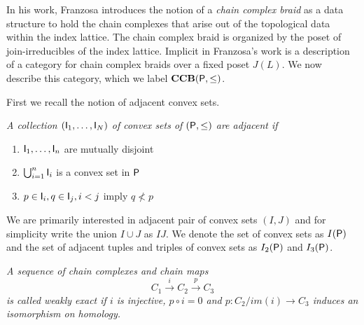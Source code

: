 In his work, Franzosa introduces the notion of a {\em chain complex braid} as a data structure to hold the chain complexes that arise out of the topological data within the index lattice.  The chain complex braid is organized by the poset of join-irreducibles of the index lattice.  Implicit in Franzosa's work is a description of a category for chain complex braids over a fixed poset $J(L)$.  We now describe this category, which we label ${\bf CCB}({\mathsf P},\leq)$.  

First we recall the notion of adjacent convex sets.

\begin{defn}
{\em
A collection $({\mathsf I}_1,\ldots, {\mathsf I}_N)$ of convex sets of $({\mathsf P},\leq)$ are {\em adjacent} if
\begin{enumerate}
\item ${\mathsf I}_1,\ldots,{\mathsf I}_n$ are mutually disjoint
\item $\bigcup_{i=1}^n {\mathsf I}_i$ is a convex set in ${\mathsf P}$
\item $p\in {\mathsf I}_i, q\in {\mathsf I}_j, i < j$ imply $q \nless p$
\end{enumerate}
}
\end{defn}

We are primarily interested in adjacent pair of convex sets $(I,J)$ and for simplicity write the union $I\cup J$ as $IJ$.  
We denote the set of convex sets as $I({\mathsf P})$ and the set of adjacent tuples and triples of convex sets as $I_2({\mathsf P})$ and $I_3({\mathsf P})$.  




\begin{defn}
{\em
A sequence of chain complexes and chain maps $$C_1\xrightarrow{i} C_2 \xrightarrow{p} C_3$$
is called {\em weakly exact} if $i$ is injective, $p\circ i = 0$ and $p:C_2/im(i)\to C_3$ induces an isomorphism on homology.
}
\end{defn}

